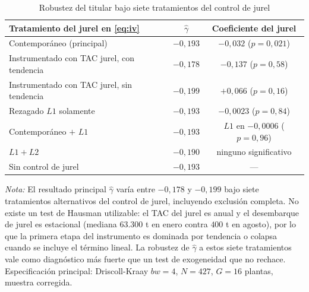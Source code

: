 \documentclass[11pt]{article}
\newcommand{\note}[2]{%
  \par\vspace{0.5ex}
  \begin{minipage}{#1}\footnotesize\textit{Nota:} #2\end{minipage}%
}
\begin{document}
\begin{table}[htbp]
  \caption{Robustez del titular bajo siete tratamientos del control de jurel}\label{tab:jurel_tratamientos}
  \centering
  \begin{tabular}{@{} lcc @{}}
    \toprule
    Tratamiento del jurel en \eqref{eq:iv} & $\hat\gamma$ & Coeficiente del jurel \\
    \midrule
    Contemporáneo (principal)                            & $-0{,}193$ & $-0{,}032$ ($p = 0{,}021$) \\
    Instrumentado con TAC jurel, con tendencia           & $-0{,}178$ & $-0{,}137$ ($p = 0{,}58$)   \\
    Instrumentado con TAC jurel, sin tendencia           & $-0{,}199$ & $+0{,}066$ ($p = 0{,}16$)   \\
    Rezagado $L1$ solamente                               & $-0{,}193$ & $-0{,}0023$ ($p = 0{,}84$) \\
    Contemporáneo $+$ $L1$                                & $-0{,}193$ & $L1$ en $-0{,}0006$ ($p = 0{,}96$) \\
    $L1 + L2$                                             & $-0{,}190$ & ninguno significativo       \\
    Sin control de jurel                                 & $-0{,}193$ & ---                         \\
    \bottomrule
  \end{tabular}
  \note{0.9\textwidth}{El resultado principal $\hat\gamma$ varía entre $-0{,}178$ y $-0{,}199$ bajo siete tratamientos alternativos del control de jurel, incluyendo exclusión completa. No existe un test de Hausman utilizable: el TAC del jurel es anual y el desembarque de jurel es estacional (mediana $63.300$ t en enero contra $400$ t en agosto), por lo que la primera etapa del instrumento es dominada por tendencia o colapsa cuando se incluye el término lineal. La robustez de $\hat\gamma$ a estos siete tratamientos vale como diagnóstico más fuerte que un test de exogeneidad que no rechace. Especificación principal: Driscoll-Kraay $bw=4$, $N=427$, $G=16$ plantas, muestra corregida.}
\end{table}
\end{document}
